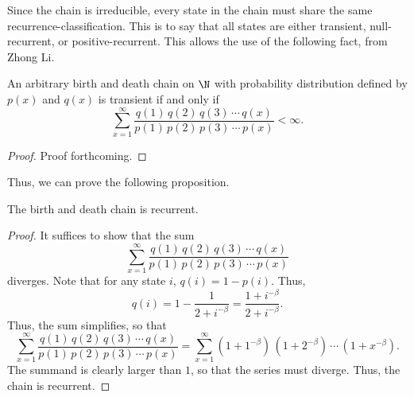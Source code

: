 Since the chain is irreducible, every state in the chain must share the same recurrence-classification.
This is to say that all states are either transient, null-recurrent, or positive-recurrent. This allows
the use of the following fact, from Zhong Li.
\begin{proposition}
    An arbitrary birth and death chain on $\N$ with probability distribution defined by $p(x)$ and
    $q(x)$ is transient if and only if
    \[
        \sum_{x = 1}^{\infty} \frac{q(1)\,q(2)\,q(3)\,\cdots\,q(x)}{p(1)\,p(2)\,p(3)\,\cdots\,p(x)} <
        \infty.  
    \]
\end{proposition}
\begin{proof}
    Proof forthcoming.
\end{proof}

Thus, we can prove the following proposition.
\begin{proposition}
    The birth and death chain is recurrent.
\end{proposition}
\begin{proof}
    It suffices to show that the sum
    \[
        \sum_{x = 1}^{\infty} \frac{q(1)\,q(2)\,q(3)\,\cdots\,q(x)}{p(1)\,p(2)\,p(3)\,\cdots\,p(x)}
    \]
    diverges. Note that for any state $i$, $q(i) = 1-p(i)$. Thus,
    \[
        q(i) = 1 - \frac{1}{2 + i^{-\beta}} = \frac{1 + i^{-\beta}}{2 + i^{-\beta}}.  
    \]
    Thus, the sum simplifies, so that
    \[
        \sum_{x = 1}^{\infty} \frac{q(1)\,q(2)\,q(3)\,\cdots\,q(x)}{p(1)\,p(2)\,p(3)\,\cdots\,p(x)} =
        \sum_{x = 1}^{\infty} (1+1^{-\beta})\,(1+2^{-\beta})\,\cdots\,(1 + x^{-\beta}).
    \]
    The summand is clearly larger than $1$, so that the series must diverge. Thus, the chain is
    recurrent.
\end{proof}

